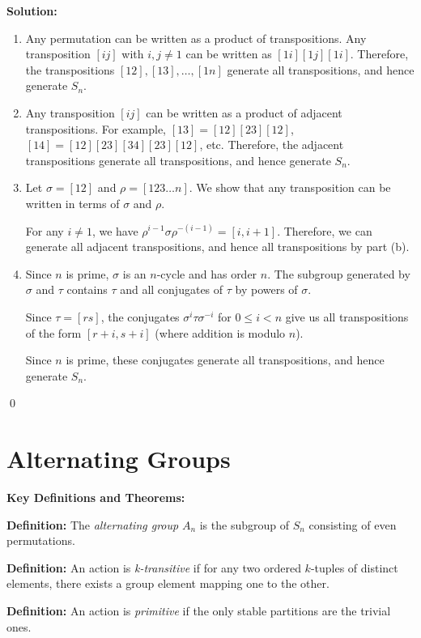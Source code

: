 \noindent\textbf{Solution:}
\begin{enumerate}[label=(\alph*)]
\item Any permutation can be written as a product of transpositions. Any transposition $[ij]$ with $i, j \neq 1$ can be written as $[1i][1j][1i]$. Therefore, the transpositions $[12], [13], \ldots, [1n]$ generate all transpositions, and hence generate $S_n$.

\item Any transposition $[ij]$ can be written as a product of adjacent transpositions. For example, $[13] = [12][23][12]$, $[14] = [12][23][34][23][12]$, etc. Therefore, the adjacent transpositions generate all transpositions, and hence generate $S_n$.

\item Let $\sigma = [12]$ and $\rho = [123 \ldots n]$. We show that any transposition can be written in terms of $\sigma$ and $\rho$.

For any $i \neq 1$, we have $\rho^{i-1}\sigma\rho^{-(i-1)} = [i, i+1]$. Therefore, we can generate all adjacent transpositions, and hence all transpositions by part (b).

\item Since $n$ is prime, $\sigma$ is an $n$-cycle and has order $n$. The subgroup generated by $\sigma$ and $\tau$ contains $\tau$ and all conjugates of $\tau$ by powers of $\sigma$.

Since $\tau = [rs]$, the conjugates $\sigma^i\tau\sigma^{-i}$ for $0 \leq i < n$ give us all transpositions of the form $[r+i, s+i]$ (where addition is modulo $n$).

Since $n$ is prime, these conjugates generate all transpositions, and hence generate $S_n$.
\end{enumerate}


\qed
\section{Alternating Groups}

\textbf{Key Definitions and Theorems:}

\textbf{Definition:} The \textit{alternating group} $A_n$ is the subgroup of $S_n$ consisting of even permutations.

\textbf{Definition:} An action is \textit{k-transitive} if for any two ordered $k$-tuples of distinct elements, there exists a group element mapping one to the other.

\textbf{Definition:} An action is \textit{primitive} if the only stable partitions are the trivial ones.

